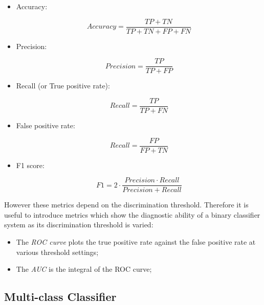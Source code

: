 \begin{itemize}

\item Accuracy:

\begin{equation}
Accuracy = \frac{TP + TN}{TP + TN + FP + FN}
\end{equation}

\item Precision:

\begin{equation}
Precision = \frac{TP}{TP + FP}
\end{equation}

\item Recall (or True positive rate):

\begin{equation}
Recall = \frac{TP}{TP + FN}
\end{equation}

\item False positive rate:

\begin{equation}
Recall = \frac{FP}{FP + TN}
\end{equation}

\item F1 score:

\begin{equation}
F1 = 2 \cdot \frac{Precision \cdot Recall}{Precision +  Recall}
\end{equation}

\end{itemize}

However these metrics depend on the discrimination threshold.
Therefore it is useful to introduce metrics which show the diagnostic ability of a binary classifier system as its discrimination threshold is varied:

\begin{itemize}

\item The \textit{ROC curve} plots the true positive rate against the false positive rate at various threshold settings;
\item The \textit{AUC} is the integral of the ROC curve;

\end{itemize}


\subsection{Multi-class Classifier}
\label{section:multiclass_explanation}

